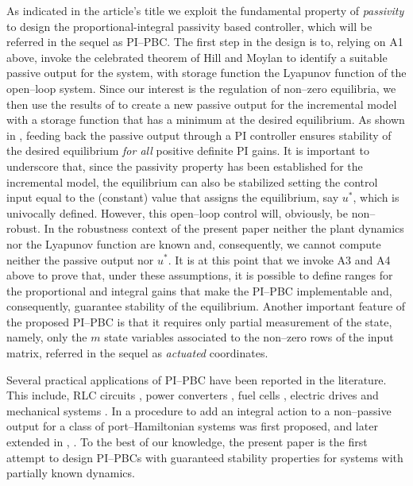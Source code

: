 \documentclass[10pt, conference]{ieeeconf}
\begin{document}
As indicated in the article's title we exploit the fundamental property of {\em passivity} to design the proportional-integral passivity based controller, which will be referred in the sequel as PI--PBC. The first step in the design is to, relying on A1 above, invoke the celebrated theorem of Hill and Moylan \cite{VAN} to identify a suitable passive output for the system,  with storage function the Lyapunov function of the open--loop system. Since our interest is the regulation of non--zero equilibria, we then use the results of \cite{JAYetal} to create a new passive output for the incremental model with a storage function that has a minimum at the desired equilibrium. As shown in \cite{JAYetal}, feeding back the passive output through a PI controller ensures stability of the desired equilibrium {\em for all} positive definite PI gains. It is important to underscore that, since the passivity property has been established for the incremental model, the equilibrium can also be stabilized setting the control input equal to the (constant) value that assigns the equilibrium, say $u^*$, which is univocally defined. However, this open--loop control will, obviously, be non--robust. In the robustness context of the present paper neither the plant dynamics nor the Lyapunov function are known and, consequently, we cannot compute neither the passive output nor $u^*$. It is at this point that we invoke A3 and A4 above to prove that, under these assumptions, it is possible to define ranges for the proportional and integral gains that make the PI--PBC implementable and, consequently, guarantee stability of the equilibrium. Another important feature of the proposed PI--PBC is that it requires only partial measurement of the state, namely, only the $m$ state variables associated to the non--zero rows of the input matrix, referred in the sequel as {\em actuated} coordinates.

Several practical applications of PI--PBC have been reported in the literature. This include, RLC circuits \cite{CASetal}, power converters \cite{HERetal}, fuel cells \cite{TALetal}, electric drives \cite{MARALE} and mechanical systems \cite{SANetal}. In \cite{DONJUN} a procedure to add an integral action to a non--passive output for a class of port--Hamiltonian systems was first proposed, and later extended in \cite{ORTROM}, \cite{ROMDONORT}. To the best of our knowledge, the present paper is the first attempt to design PI--PBCs with guaranteed stability properties for systems with partially known dynamics.
\end{document}
